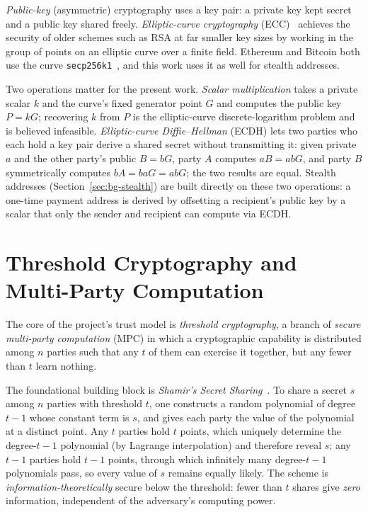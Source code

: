 \emph{Public-key} (asymmetric) cryptography uses a key pair: a private key kept
secret and a public key shared freely. \emph{Elliptic-curve cryptography}
(ECC)~\cite{koblitz1987, miller1986} achieves the security of older schemes such
as RSA at far smaller key sizes by working in the group of points on an elliptic
curve over a finite field. Ethereum and Bitcoin both use the curve
\texttt{secp256k1}~\cite{sec2}, and this work uses it as well for stealth
addresses.

Two operations matter for the present work. \emph{Scalar multiplication} takes a
private scalar $k$ and the curve's fixed generator point $G$ and computes the
public key $P = kG$; recovering $k$ from $P$ is the elliptic-curve
discrete-logarithm problem and is believed infeasible. \emph{Elliptic-curve
Diffie--Hellman} (ECDH) lets two parties who each hold a key pair derive a shared
secret without transmitting it: given private $a$ and the other party's public
$B = bG$, party $A$ computes $aB = abG$, and party $B$ symmetrically computes
$bA = baG = abG$; the two results are equal. Stealth addresses
(Section~\ref{sec:bg-stealth}) are built directly on these two operations: a
one-time payment address is derived by offsetting a recipient's public key by a
scalar that only the sender and recipient can compute via ECDH.

\section{Threshold Cryptography and Multi-Party Computation}
\label{sec:bg-threshold}

The core of the project's trust model is \emph{threshold cryptography}, a branch
of \emph{secure multi-party computation} (MPC) in which a cryptographic
capability is distributed among $n$ parties such that any $t$ of them can
exercise it together, but any fewer than $t$ learn nothing.

The foundational building block is \emph{Shamir's Secret
Sharing}~\cite{shamir1979}. To share a secret $s$ among $n$ parties with
threshold $t$, one constructs a random polynomial of degree $t-1$ whose constant
term is $s$, and gives each party the value of the polynomial at a distinct
point. Any $t$ parties hold $t$ points, which uniquely determine the degree-$t-1$
polynomial (by Lagrange interpolation) and therefore reveal $s$; any $t-1$
parties hold $t-1$ points, through which infinitely many degree-$t-1$ polynomials
pass, so every value of $s$ remains equally likely. The scheme is
\emph{information-theoretically} secure below the threshold: fewer than $t$
shares give \emph{zero} information, independent of the adversary's computing
power.

